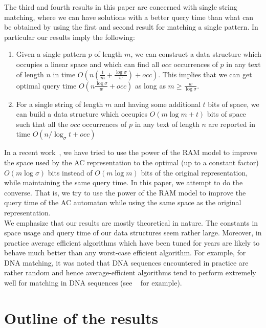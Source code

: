 \documentclass{article}
\newcommand{\?}{\mskip1.5mu}
\begin{document}
The third and fourth results in this paper are concerned with single string matching, where we can have solutions with a better query time than what can be obtained by using the first and second result for matching a single pattern. In particular our results imply the following:
\begin{enumerate}
\item Given a single pattern $p$ of length $m$, we can construct a data structure which occupies a linear space and which can find all $occ$ occurrences of $p$ in any text of length $n$ in time $O(n(\frac{1}{m}+\frac{\log\sigma}{w})+occ)$. This implies that we can get optimal query time  $O(n\frac{\log\sigma}{w}+occ)$ as long as $m\geq \frac{w}{\log\sigma}$.
\item For a single string of length $m$ and having some additional $t$ bits of space, we can build a data structure which occupies $O(m\log m+t)$ bits of space such that all the $occ$ occurrences of $p$ in any text of length $n$ are reported in time $O(n/\log_\sigma t+occ)$
\end{enumerate}

In a recent work~\cite{B10a}, we have tried to use the power of the RAM model to improve the space used by the AC representation to the optimal (up to a constant factor) $O(m\log\sigma)$ bits instead of $O(m\log m)$ bits of the original representation, while maintaining the same query time. In this paper, we attempt to do the converse. That is, we try to use the power of the RAM model to improve the query time of the AC automaton while using the same space as the original representation. 
\\
We emphasize that our results are mostly theoretical in nature. The constants in space usage and query time of our data structures seem rather large. Moreover, in practice average efficient algorithms which have been tuned for years are likely to behave much better than any worst-case efficient algorithm. For example, for DNA matching, it was noted that DNA sequences encountered in practice are rather random and hence average-efficient algorithms tend to perform extremely well for matching in DNA sequences (see ~\cite{RSKKT09} for example). 
\section{Outline of the results}
\end{document}
